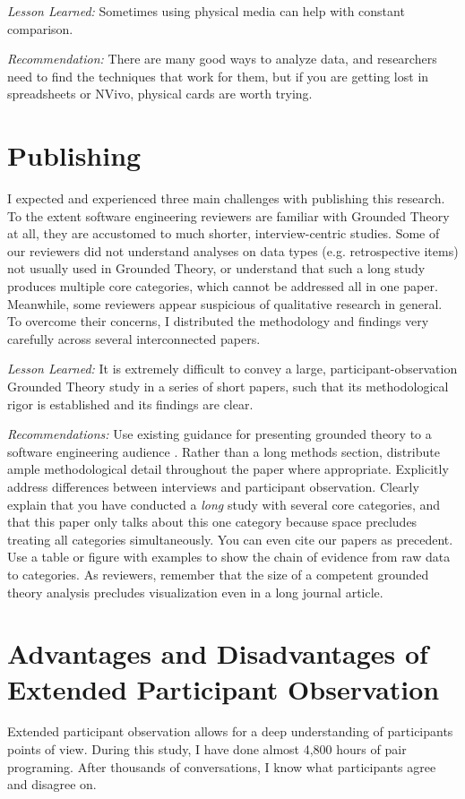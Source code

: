 \textit{Lesson Learned:} Sometimes using physical media can help with constant comparison. 

\textit{Recommendation:} There are many good ways to analyze data, and researchers need to find the techniques that work for them, but if you are getting lost in spreadsheets or NVivo, physical cards are worth trying.
\section{Publishing}
\label{Publishing}

I expected and experienced three main challenges with publishing this research. To the extent software engineering reviewers are familiar with Grounded Theory at all, they are accustomed to much shorter, interview-centric studies. Some of our reviewers did not understand analyses on data types (e.g. retrospective items) not usually used in Grounded Theory, or understand that such a long study produces multiple core categories, which cannot be addressed all in one paper. Meanwhile, some reviewers appear suspicious of qualitative research in general. To overcome their concerns, I distributed the methodology and findings very carefully across several interconnected papers. 

\textit{Lesson Learned:} It is extremely difficult to convey a large, participant-observation Grounded Theory study in a series of short papers, such that its methodological rigor is established and its findings are clear.

\textit{Recommendations:} Use existing guidance for presenting grounded theory to a software engineering audience \cite{StolGroundedTheory}. Rather than a long methods section, distribute ample methodological detail throughout the paper where appropriate. Explicitly address differences between interviews and participant observation. Clearly explain that you have conducted a \textit{long} study with several core categories, and that this paper only talks about this one category because space precludes treating all categories simultaneously. You can even cite our papers as precedent. Use a table or figure with examples to show the chain of evidence from raw data to categories. As reviewers, remember that the size of a competent grounded theory analysis precludes visualization even in a long journal article.
\section{Advantages and Disadvantages of Extended Participant Observation}
\label{AdvantagesDisadvantages}
Extended participant observation allows for a deep understanding of participants points of view. During this study, I have done almost 4,800 hours of pair programing. After thousands of conversations, I know what participants agree and disagree on. 

